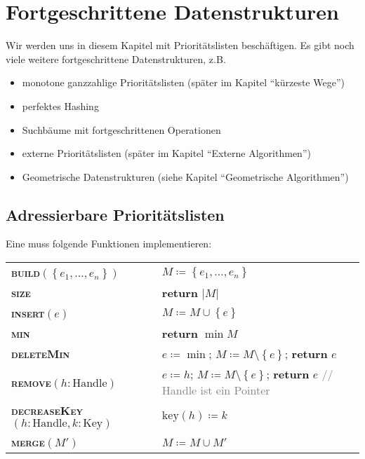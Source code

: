 \chapter{Fortgeschrittene Datenstrukturen}

Wir werden uns in diesem Kapitel mit Prioritätslisten beschäftigen. Es gibt noch viele weitere fortgeschrittene Datenstrukturen, z.B.
\begin{itemize}
  \item monotone ganzzahlige Prioritätslisten (später im Kapitel ``kürzeste Wege'')
  \item perfektes Hashing
  \item Suchbäume mit fortgeschrittenen Operationen
  \item externe Prioritätslisten (später im Kapitel ``Externe Algorithmen'')
  \item Geometrische Datenstrukturen (siehe Kapitel ``Geometrische Algorithmen'')
\end{itemize}

\section{Adressierbare Prioritätslisten}

Eine  muss folgende Funktionen implementieren:

\begin{pseudocode}
  \begin{tabular}{ll}
    \textbf{\textsc{build}}\( (\left \{ e_1,\dots,e_n \right \}) \) & \( M \coloneqq \left \{ e_1,\dots,e_n \right \} \) \\
    \textbf{\textsc{size}} & \textbf{return} \( \left\vert M \right\vert \) \\
    \textbf{\textsc{insert}}\( (e) \) & \( M \coloneqq M \cup \left \{ e \right \} \) \\
    \textbf{\textsc{min}} & \textbf{return} \( \min M \) \\
    \textbf{\textsc{deleteMin}} & \( e \coloneqq \min \); \enskip{} \( M \coloneqq M \setminus \left \{ e \right \} \); \enskip{} \textbf{return} \( e \) \\
    \textbf{\textsc{remove}}\( (h : \text{Handle}) \) & \( e \coloneqq h \); \enskip{} \( M \coloneqq M \setminus \left \{ e \right \} \); \enskip{} \textbf{return} \( e \) \textcolor{gray}{// Handle ist ein Pointer}\\
    \textbf{\textsc{decreaseKey}}\( (h : \text{Handle}, k : \text{Key}) \) & \( \text{key}(h) \coloneqq k \) \\
    \textbf{\textsc{merge}}\( (M') \) & \( M \coloneqq M \cup M' \)
  \end{tabular}
\end{pseudocode}

